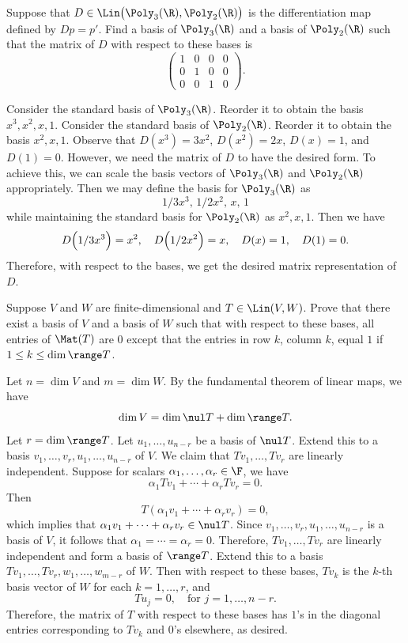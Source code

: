 \begin{exc}
\begin{exercise}
Suppose that $D\in\Lin\bigl(\Poly_3(\R),\Poly_2(\R)\bigr)$ is the
differentiation map defined by $Dp=p'$. Find a basis of $\Poly_3(\R)$ and a
basis of $\Poly_2(\R)$ such that the matrix of $D$ with respect to these bases
is
\[ \begin{pmatrix} 1 & 0 & 0 & 0\\ 0 & 1 & 0 & 0\\ 0 & 0 & 1 & 0
   \end{pmatrix}. \]
\end{exercise}
\begin{solution}
Consider the standard basis of $\Poly_3(\R)$. Reorder it to obtain the basis
$x^3,x^2,x,1$. Consider the standard basis of $\Poly_2(\R)$. Reorder it to
obtain the basis $x^2,x,1$. Observe that $D(x^3)=3x^2$, $D(x^2)=2x$, $D(x)=1$,
and $D(1)=0$. However, we need the matrix of $D$ to have the desired form. To
achieve this, we can scale the basis vectors of $\Poly_3(\R)$ and $\Poly_2(\R)$
appropriately. Then we may define the basis for $\Poly_3(\R)$ as
\[ 1/3x^3,\,1/2x^2,\,x,\,1 \]
while maintaining the standard basis for $\Poly_2(\R)$ as $x^2,x,1$. Then we
have
\[ D\Bigl(1/3x^3\Bigr)=x^2, \quad D\Bigl(1/2x^2\Bigr)=x, \quad
   D(x)=1, \quad D(1)=0. \]
Therefore, with respect to the bases, we get the desired matrix representation
of $D$.
\end{solution}

\begin{exercise}
Suppose $V$ and $W$ are finite-dimensional and $T\in\Lin(V,W)$. Prove that
there exist a basis of $V$ and a basis of $W$ such that with respect to these
bases, all entries of $\Mat(T)$ are $0$ except that the entries in row $k$,
column $k$, equal $1$ if $1\le k\le\dim\range T$.
\end{exercise}
\begin{solution}
Let $n=\dim V$ and $m=\dim W$. By the fundamental theorem of linear maps, we
have
\[ \dim V = \dim\nul T+\dim\range T. \]
Let $r=\dim\range T$. Let $u_1,\dots,u_{n-r}$ be a basis of $\nul T$. Extend
this to a basis $v_1,\dots,v_r,u_1,\dots,u_{n-r}$ of $V$. We claim that
$Tv_1,\dots,Tv_r$ are linearly independent. Suppose for scalars
$\alpha_1,\dots,\alpha_r\in\F$, we have
\[ \alpha_1Tv_1+\cdots+\alpha_rTv_r = 0. \]
Then
\[ T(\alpha_1v_1+\cdots+\alpha_rv_r) = 0, \]
which implies that $\alpha_1v_1+\cdots+\alpha_rv_r\in\nul T$. Since
$v_1,\dots,v_r,u_1,\dots,u_{n-r}$ is a basis of $V$, it follows that
$\alpha_1=\cdots=\alpha_r=0$. Therefore, $Tv_1,\dots,Tv_r$ are linearly
independent and form a basis of $\range T$. Extend this to a basis
$Tv_1,\dots,Tv_r,w_1,\dots,w_{m-r}$ of $W$. Then with respect to these bases,
$Tv_k$ is the $k$-th basis vector of $W$ for each $k=1,\dots,r$, and
\[ Tu_j = 0, \quad\text{for } j=1,\dots,n-r. \]
Therefore, the matrix of $T$ with respect to these bases has $1$'s in the
diagonal entries corresponding to $Tv_k$ and $0$'s elsewhere, as desired.
\end{solution}


\end{exc}
